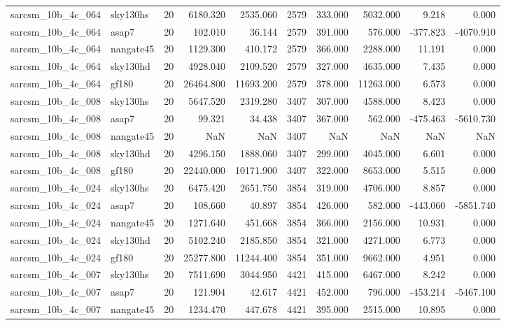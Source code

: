 \begin{longtable}{llrrrrrrrr}
sarcsm\_10b\_4c\_064 & sky130hs & 20 & 6180.320 & 2535.060 & 2579 & 333.000 & 5032.000 & 9.218 & 0.000 \\
sarcsm\_10b\_4c\_064 & asap7 & 20 & 102.010 & 36.144 & 2579 & 391.000 & 576.000 & -377.823 & -4070.910 \\
sarcsm\_10b\_4c\_064 & nangate45 & 20 & 1129.300 & 410.172 & 2579 & 366.000 & 2288.000 & 11.191 & 0.000 \\
sarcsm\_10b\_4c\_064 & sky130hd & 20 & 4928.040 & 2109.520 & 2579 & 327.000 & 4635.000 & 7.435 & 0.000 \\
sarcsm\_10b\_4c\_064 & gf180 & 20 & 26464.800 & 11693.200 & 2579 & 378.000 & 11263.000 & 6.573 & 0.000 \\
sarcsm\_10b\_4c\_008 & sky130hs & 20 & 5647.520 & 2319.280 & 3407 & 307.000 & 4588.000 & 8.423 & 0.000 \\
sarcsm\_10b\_4c\_008 & asap7 & 20 & 99.321 & 34.438 & 3407 & 367.000 & 562.000 & -475.463 & -5610.730 \\
sarcsm\_10b\_4c\_008 & nangate45 & 20 & NaN & NaN & 3407 & NaN & NaN & NaN & NaN \\
sarcsm\_10b\_4c\_008 & sky130hd & 20 & 4296.150 & 1888.060 & 3407 & 299.000 & 4045.000 & 6.601 & 0.000 \\
sarcsm\_10b\_4c\_008 & gf180 & 20 & 22440.000 & 10171.900 & 3407 & 322.000 & 8653.000 & 5.515 & 0.000 \\
sarcsm\_10b\_4c\_024 & sky130hs & 20 & 6475.420 & 2651.750 & 3854 & 319.000 & 4706.000 & 8.857 & 0.000 \\
sarcsm\_10b\_4c\_024 & asap7 & 20 & 108.660 & 40.897 & 3854 & 426.000 & 582.000 & -443.060 & -5851.740 \\
sarcsm\_10b\_4c\_024 & nangate45 & 20 & 1271.640 & 451.668 & 3854 & 366.000 & 2156.000 & 10.931 & 0.000 \\
sarcsm\_10b\_4c\_024 & sky130hd & 20 & 5102.240 & 2185.850 & 3854 & 321.000 & 4271.000 & 6.773 & 0.000 \\
sarcsm\_10b\_4c\_024 & gf180 & 20 & 25277.800 & 11244.400 & 3854 & 351.000 & 9662.000 & 4.951 & 0.000 \\
sarcsm\_10b\_4c\_007 & sky130hs & 20 & 7511.690 & 3044.950 & 4421 & 415.000 & 6467.000 & 8.242 & 0.000 \\
sarcsm\_10b\_4c\_007 & asap7 & 20 & 121.904 & 42.617 & 4421 & 452.000 & 796.000 & -453.214 & -5467.100 \\
sarcsm\_10b\_4c\_007 & nangate45 & 20 & 1234.470 & 447.678 & 4421 & 395.000 & 2515.000 & 10.895 & 0.000 \\

\end{longtable}
